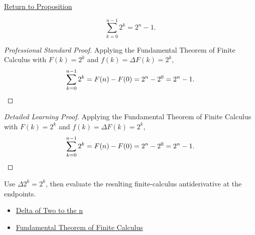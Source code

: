 \newpage
{}
\label{prf:antideriv-two-n}

\begin{remark*}[Return]
\hyperref[prop:antideriv-two-n]{Return to Proposition}
\end{remark*}

\begin{proposition*}[Antiderivative of \(2^n\)]
\[
\sum_{k=0}^{n-1} 2^k = 2^n - 1.
\]
\end{proposition*}

\begin{proof}[Professional Standard Proof]
\LRAProofBodyStart
Applying the Fundamental Theorem of Finite Calculus with \(F(k) = 2^k\)
and \(f(k) = \Delta F(k) = 2^k\),
\[
\sum_{k=0}^{n-1} 2^k = F(n) - F(0) = 2^n - 2^0 = 2^n - 1. \qedhere
\]
\end{proof}

\begin{proof}[Detailed Learning Proof]
\LRAProofBodyStart
Applying the Fundamental Theorem of Finite Calculus with \(F(k) = 2^k\)
and \(f(k) = \Delta F(k) = 2^k\),
\[
\sum_{k=0}^{n-1} 2^k = F(n) - F(0) = 2^n - 2^0 = 2^n - 1. \qedhere
\]
\end{proof}

\begin{remark*}
Use \(\Delta 2^k=2^k\), then evaluate the resulting finite-calculus
antiderivative at the endpoints.
\end{remark*}

\begin{dependencies}
\begin{itemize}
  \item \hyperref[prop:delta-two-n]{Delta of Two to the n}
  \item \hyperref[thm:fundamental-theorem-finite-calculus]{Fundamental Theorem of Finite Calculus}
\end{itemize}
\end{dependencies}
\clearpage
